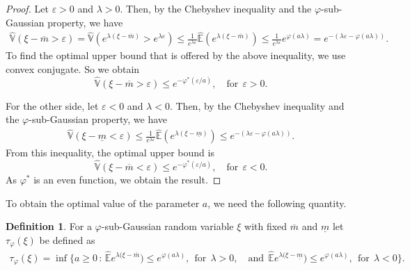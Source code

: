 \documentclass[12pt]{article}
\theoremstyle{definition}
\newtheorem{definition}[theorem]{Definition}
\theoremstyle{remark}
\numberwithin{equation}{section}
\def\Eh{{\hat{\mathbb{E}}}}
\def\Vh{{\hat{\mathbb{V}}}}
\begin{document}
\begin{proof}
Let $\varepsilon>0$ and $\lambda>0$.
Then, by the Chebyshev inequality and the $\varphi$-sub-Gaussian property, we have
\begin{eqnarray}
\Vh(\xi-\overline{m} > \varepsilon) =
\Vh \left( e^{ \lambda(\xi -\overline{m})} > e^{\lambda\varepsilon} \right)  
\le
\frac{1}{e^{\lambda\varepsilon}} \Eh \left( e^{ \lambda(\xi -\overline{m}) }\right)
\le
\frac{1}{e^{\lambda\varepsilon}} e^{ \varphi(a\lambda)}
=e^{-( \lambda\varepsilon- \varphi(a\lambda))}.
\end{eqnarray}
To find the optimal upper bound that is offered by the above inequality, we use convex conjugate.
So we obtain
\begin{equation}
\Vh(\xi-\overline{m} > \varepsilon)  \le e^{-\varphi^*\left(\varepsilon/a\right)}, \quad \text{for} \ \ \varepsilon>0.
\end{equation}

For the other side, let $\varepsilon<0$ and $\lambda<0$.
Then, by the Chebyshev inequality and the $\varphi$-sub-Gaussian property, we have
\begin{eqnarray}
\Vh(\xi-\underline{m} < \varepsilon) \le
\frac{1}{e^{\lambda\varepsilon}} \Eh \left( e^{ \lambda(\xi -\underline{m}) }\right)
\le
e^{-( \lambda\varepsilon- \varphi(a\lambda))}.
\end{eqnarray}
From this inequality, the optimal upper bound is
\begin{equation}
\Vh(\xi-\overline{m} < \varepsilon)  \le e^{-\varphi^*\left(\varepsilon/a\right)}, \quad \text{for} \ \ \varepsilon<0.
\end{equation}
As $\varphi^*$ is an even function, we obtain the result.
\end{proof}

To obtain the optimal value of the parameter $a$, we need the following quantity.
\begin{definition} \label{tau}
For a $\varphi$-sub-Gaussian random variable $\xi$ with fixed $\overline{m}$ and $\underline{m}$
 let $\tau_\varphi(\xi)$ be defined as
\begin{eqnarray*}
\tau_\varphi(\xi)
=
\inf\Big\{
a \ge 0 \, :\, 
\Eh e^{\lambda(\xi - \overline{m}}) \le e^{\varphi(a\lambda)}, \ \ {\text {for}} \ \ \lambda>0, \quad 
\text{and} \ \ \Eh e^{\lambda(\xi - \underline{m}}) \le e^{\varphi(a\lambda)}, \ \ {\text {for}} \ \ \lambda<0  
\Big\}.
\end{eqnarray*}
\end{definition}
\end{document}
